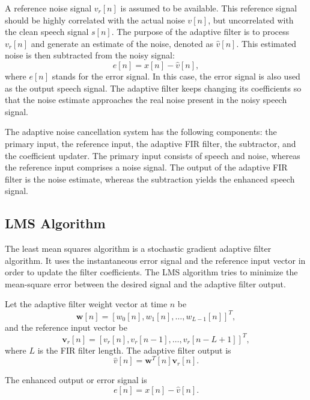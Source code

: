 \documentclass[12pt]{article}
\begin{document}
A reference noise signal $v_r[n]$ is assumed to be available. This reference signal should be highly correlated with the actual noise $v[n]$, but uncorrelated with the clean speech signal $s[n]$. The purpose of the adaptive filter is to process $v_r[n]$ and generate an estimate of the noise, denoted as $\hat{v}[n]$. This estimated noise is then subtracted from the noisy signal:
\begin{equation}
e[n] = x[n] - \hat{v}[n],
\end{equation}
where $e[n]$ stands for the error signal. In this case, the error signal is also used as the output speech signal. The adaptive filter keeps changing its coefficients so that the noise estimate approaches the real noise present in the noisy speech signal.

The adaptive noise cancellation system has the following components: the primary input, the reference input, the adaptive FIR filter, the subtractor, and the coefficient updater. The primary input consists of speech and noise, whereas the reference input comprises a noise signal. The output of the adaptive FIR filter is the noise estimate, whereas the subtraction yields the enhanced speech signal.

\subsection{LMS Algorithm}

The least mean squares algorithm is a stochastic gradient adaptive filter algorithm. It uses the instantaneous error signal and the reference input vector in order to update the filter coefficients. The LMS algorithm tries to minimize the mean-square error between the desired signal and the adaptive filter output.

Let the adaptive filter weight vector at time $n$ be
\begin{equation}
\mathbf{w}[n] =
[w_0[n], w_1[n], \ldots, w_{L-1}[n]]^T,
\end{equation}
and the reference input vector be
\begin{equation}
\mathbf{v}_r[n] =
[v_r[n], v_r[n-1], \ldots, v_r[n-L+1]]^T,
\end{equation}
where $L$ is the FIR filter length. The adaptive filter output is
\begin{equation}
\hat{v}[n] = \mathbf{w}^T[n]\mathbf{v}_r[n].
\end{equation}

The enhanced output or error signal is
\begin{equation}
e[n] = x[n] - \hat{v}[n].
\end{equation}
\end{document}
